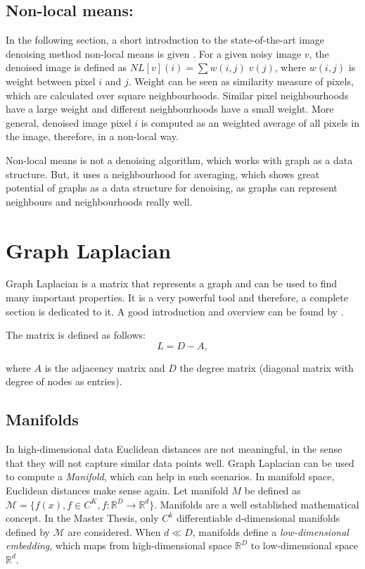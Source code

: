 \subsection{Non-local means:}
In the following section, a short introduction to the 
state-of-the-art image denoising method non-local means is given \cite{noneLocalMean}.
For a given noisy image $v$, the denoised image is defined as $NL[v](i) = \sum{w(i,j) \; v(j)}$,
where $w(i,j)$ is weight between pixel $i$ and $j$. 
Weight can be seen as similarity measure of pixels, which are calculated over square neighbourhoods.
Similar pixel neighbourhoods have a large weight and different neighbourhoods have a small weight.
More general, denoised image pixel $i$ is computed as an weighted average of all pixels in the 
image, therefore, in a non-local way.

Non-local means is not a denoising algorithm, which works with graph as a data structure.
But, it uses a neighbourhood for averaging, which shows great potential of graphs
as a data structure for denoising, as graphs can represent neighbours and neighbourhoods really well.


\section{Graph Laplacian}
Graph Laplacian is a matrix that represents a graph and can be used to find many important properties.
It is a very powerful tool and therefore, a complete section is dedicated to it.
A good introduction and overview can be found by \cite{tutorialSpectralClustering, SpectralGraphTheory}. 

The matrix is defined as follows:
\begin{equation}
    L = D - A,
\end{equation}

where $A$ is the adjacency matrix and $D$ the degree matrix (diagonal matrix with degree of nodes as entries).

\subsection{Manifolds}
\label{sec:manifolds}

In high-dimensional data Euclidean distances are not meaningful,
in the sense that they will not capture similar data points well.
Graph Laplacian can be used to compute a \textit{Manifold}, which can help in such scenarios. 
In manifold space, Euclidean distances make sense again. 
Let manifold $M$ be defined as $\mathcal{M} = \{ f(x), f \in C^K, f: \mathbb{R}^D \to \mathbb{R}^d \}$.
Manifolds are a well established mathematical concept. In the Master Thesis, only 
$C^k$ differentiable d-dimensional manifolds defined by $\mathcal{M}$ are considered. 
When $d \ll D$, manifolds define a \textit{low-dimensional embedding}, which maps from high-dimensional space 
$\mathbb{R}^D$ to low-dimensional space $\mathbb{R}^d$.


